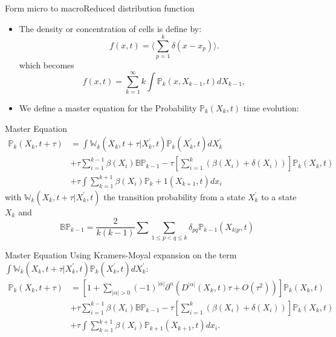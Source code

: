 \documentclass[10pt]{beamer}
\theoremstyle{remark}
\begin{document}
\begin{frame}{Form micro to macro}{Reduced distribution function}
\begin{itemize}
	\item  The density or concentration of cells is define by: 
	$$ f(x,t) = \langle \sum_{p=1}^{k} \delta(x-x_p)\rangle . $$
	which becomes
	$$f(x,t) =  \sum_{k=1}^{\infty} k \int \mathbb{P}_k(x, X_{k-1}, t)dX_{k-1},$$
	\item  We define a master equation for the Probability  $\mathbb{P}_k(X_{k}, t)$ time evolution: 
\end{itemize}
\end{frame}

\begin{frame}{Master Equation}
\begin{align*}
\label{masterEquation}
\mathbb{P}_k(X_k, t+\tau) &= \int \mathbb{W}_k(X_k, t+\tau \vert X_k^{'},t)\mathbb{P}_k( X_k^{'},t)d X_k^{'} \nonumber \\ 
&+ \tau \sum_{i=1}^{k-1}\beta(X_i) \mathbb{B} \mathbb{P}_{k-1} - \tau \left[ \sum_{i=1}^{k} (\beta(X_i) + \delta(X_i)) \right] \mathbb{P}_k(X_k,t) \\ 
&+ \tau \int \sum_{k=1}^{k+1} \beta(X_i) \mathbb{P}{_k+1}(X_{k+1}, t)dx_i \nonumber
\end{align*}
with $\mathbb{W}_k(X_k, t+\tau \vert X_k^{'},t)$ the transition probability from a state $X_k^{'}$ to a state $X_k$ and 
\begin{equation}
\label{birthOperator}
\mathbb{B} \mathbb{P}_{k-1} = \dfrac{2}{k(k-1)} \sum \sum_{1 \leq p < q \leq k} \delta_{pq} \mathbb{P}_{k-1} (X_{k|p},t) 
\end{equation}
\end{frame}

\begin{frame}{Master Equation}
Using Kramers-Moyal expansion on the term $\int \mathbb{W}_k(X_k, t+\tau \vert X_k^{'},t)\mathbb{P}_k( X_k^{'},t)d X_k^{'}$: 
\begin{align*}
\mathbb{P}_k(X_k, t+\tau) &= \left[ 1 + \sum_{\vert \alpha \vert >0} (-1)^{\vert \alpha \vert}  \partial^{\alpha} \left(D^{\vert \alpha \vert} (X_k, t) \tau + O(\tau^2) \right) \right] \mathbb{P}_k(X_k,t) \nonumber \\ 
&+ \tau \sum_{i=1}^{k-1}\beta(X_i) \mathbb{B} \mathbb{P}_{k-1} - \tau \left[ \sum_{i=1}^{k} (\beta(X_i) + \delta(X_i)) \right] \mathbb{P}_k(X_k,t) \\ 
&+ \tau \int \sum_{k=1}^{k+1} \beta(X_i) \mathbb{P}_{k+1}(X_{k+1}, t)dx_i. 
\end{align*}
\end{frame}
\end{document}
